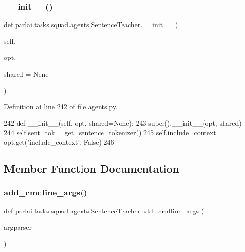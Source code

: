 \subsubsection{\texorpdfstring{\+\_\+\+\_\+init\+\_\+\+\_\+()}{\_\_init\_\_()}}
{\footnotesize\ttfamily def parlai.\+tasks.\+squad.\+agents.\+Sentence\+Teacher.\+\_\+\+\_\+init\+\_\+\+\_\+ (\begin{DoxyParamCaption}\item[{}]{self,  }\item[{}]{opt,  }\item[{}]{shared = {\ttfamily None} }\end{DoxyParamCaption})}



Definition at line 242 of file agents.\+py.


\begin{DoxyCode}
242     \textcolor{keyword}{def }\_\_init\_\_(self, opt, shared=None):
243         super().\_\_init\_\_(opt, shared)
244         self.sent\_tok = \hyperlink{namespaceparlai_1_1tasks_1_1squad_1_1agents_aedb3f218a9f6d84f322f3b17372bd047}{get\_sentence\_tokenizer}()
245         self.include\_context = opt.get(\textcolor{stringliteral}{'include\_context'}, \textcolor{keyword}{False})
246 
\end{DoxyCode}


\subsection{Member Function Documentation}
\mbox{\label{classparlai_1_1tasks_1_1squad_1_1agents_1_1SentenceTeacher_a7cbe635ae17b8deee040f3f23e9163fa}} 
\subsubsection{\texorpdfstring{add\+\_\+cmdline\+\_\+args()}{add\_cmdline\_args()}}
{\footnotesize\ttfamily def parlai.\+tasks.\+squad.\+agents.\+Sentence\+Teacher.\+add\+\_\+cmdline\+\_\+args (\begin{DoxyParamCaption}\item[{}]{argparser }\end{DoxyParamCaption})\hspace{0.3cm}{\ttfamily [static]}}



